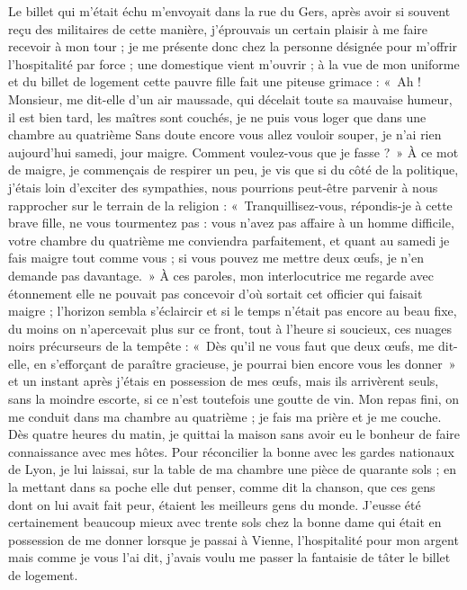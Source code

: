 \documentclass[11pt,a4paper]{report}
\begin{document}
Le billet qui m'était échu m'envoyait dans la rue du Gers, après avoir si souvent reçu des militaires de cette manière, j'éprouvais un certain plaisir à me faire recevoir à mon tour ; je me présente donc chez la personne désignée pour m'offrir l'hospitalité par force ; une domestique vient m'ouvrir ; à la vue de mon uniforme et du billet de logement cette pauvre fille fait une piteuse grimace : «~Ah ! Monsieur, me dit-elle d'un air maussade, qui décelait toute sa mauvaise humeur, il est bien tard, les maîtres sont couchés, je ne puis vous loger que dans une chambre au quatrième Sans doute encore vous allez vouloir souper, je n'ai rien aujourd'hui samedi, jour maigre. Comment voulez-vous que je fasse ?~» À ce mot de maigre, je commençais de respirer un peu, je vis que si du côté de la politique, j'étais loin d'exciter des sympathies, nous pourrions peut-être parvenir à nous rapprocher sur le terrain de la religion : «~Tranquillisez-vous, répondis-je à cette brave fille, ne vous tourmentez pas : vous n'avez pas affaire à un homme difficile, votre chambre du quatrième me conviendra parfaitement, et quant au samedi je fais maigre tout comme vous ; si vous pouvez me mettre deux œufs, je n'en demande pas davantage.~» À ces paroles, mon interlocutrice me regarde avec étonnement elle ne pouvait pas concevoir d'où sortait cet officier qui faisait maigre ; l'horizon sembla s'éclaircir et si le temps n'était pas encore au beau fixe, du moins on n'apercevait plus sur ce front, tout à l'heure si soucieux, ces nuages noirs précurseurs de la tempête : «~Dès qu'il ne vous faut que deux œufs, me dit-elle, en s'efforçant de paraître gracieuse, je pourrai bien encore vous les donner~» et un instant après j'étais en possession de mes œufs, mais ils arrivèrent seuls, sans la moindre escorte, si ce n'est toutefois une goutte de vin. Mon repas fini, on me conduit dans ma chambre au quatrième ; je fais ma prière et je me couche. Dès quatre heures du matin, je quittai la maison sans avoir eu le bonheur de faire connaissance avec mes hôtes. Pour réconcilier la bonne avec les gardes nationaux de Lyon, je lui laissai, sur la table de ma chambre une pièce de quarante sols ; en la mettant dans sa poche elle dut penser, comme dit la chanson, que ces gens dont on lui avait fait peur, étaient les meilleurs gens du monde. J'eusse été certainement beaucoup mieux avec trente sols chez la bonne dame qui était en possession de me donner lorsque je passai à Vienne, l'hospitalité pour mon argent mais comme je vous l'ai dit, j'avais voulu me passer la fantaisie de tâter le billet de logement.
\end{document}
